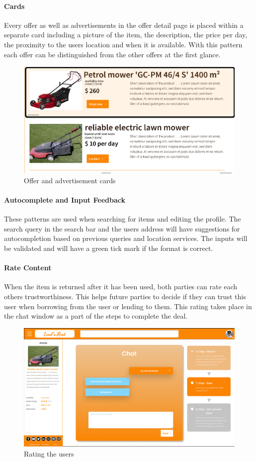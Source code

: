 	\paragraph{Cards}
		Every offer as well as advertisements in the offer detail page is placed within a separate card including a picture of the item, the description, the price per day, the proximity to the users location and when it is available. With this pattern each offer can be distinguished from the other offers at the first glance.
		
		\begin{figure}[H]
			\centering
			\includegraphics[width=0.5\linewidth]{abb/3_design_guidelines/cards.png}
			\caption{Offer and advertisement cards}
			\label{fig:cards}
			\centering
		\end{figure}
	\par
	
	\paragraph{Autocomplete and Input Feedback}
		These patterns are used when searching for items and editing the profile. The search query in the search bar and the users address will have suggestions for autocompletion based on previous queries and location services. The inputs will be validated and will have a green tick mark if the format is correct.
	\par
	
	\paragraph{Rate Content}
		When the item is returned after it has been used, both parties can rate each others trustworthiness. This helps future parties to decide if they can trust this user when borrowing from the user or lending to them. This rating takes place in the chat window as a part of the steps to complete the deal.
		
		\begin{figure}[H]
			\centering
			\includegraphics[width=0.5\linewidth]{abb/3_design_guidelines/rate.png}
			\caption{Rating the users}
			\label{fig:rate}
			\centering
		\end{figure}
	\par
	
